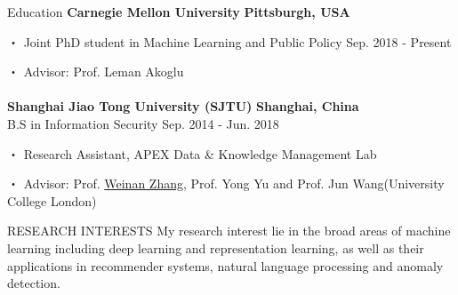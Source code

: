 \documentclass{resume} %
\begin{document}
\vspace{-1em}

\vspace{20pt}
\begin{rSection}{Education}
\textbf{Carnegie Mellon University} \hfill \textbf{Pittsburgh, USA}
\vspace{-5pt}
\item[・]Joint PhD student in Machine Learning and Public Policy \hfill Sep. 2018 - Present
\vspace{-5pt}
\item[・]Advisor: Prof. Leman Akoglu \\ \\
\textbf{Shanghai Jiao Tong University (SJTU)} \hfill \textbf{Shanghai, China}\\ %
B.S in Information Security \hfill Sep. 2014 - Jun. 2018
\vspace{-5pt}
\item[・] Research Assistant, APEX Data \& Knowledge Management Lab
\vspace{-5pt}
\item[・] Advisor: Prof. \href{http://wnzhang.net}{Weinan Zhang}, Prof. Yong Yu and Prof. Jun Wang(University College London)
\end{rSection}

\begin{rSection}{RESEARCH INTERESTS}
My research interest lie in the broad areas of machine learning including deep learning and representation learning, as well as their applications in recommender systems, natural language processing and anomaly detection.
\end{rSection}
\end{document}
